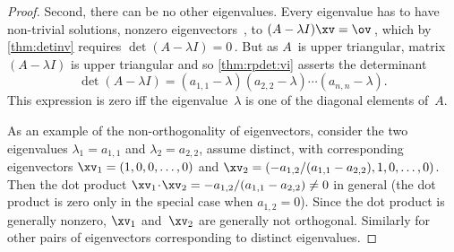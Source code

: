 \begin{proof}
Second, there can be no other eigenvalues.
Every eigenvalue has to have non-trivial solutions, nonzero eigenvectors~\xv, to \((A-\lambda I)\xv=\ov\)\,, which by \cref{thm:detinv} requires \(\det(A-\lambda I)=0\)\,.
But as \(A\)~is upper triangular, matrix \((A-\lambda I)\) is upper triangular and so \cref{thm:rpdet:vi} asserts the determinant
\begin{equation*}
\det(A-\lambda I)=(a_{1,1}-\lambda)(a_{2,2}-\lambda)
\cdots(a_{n,n}-\lambda).
\end{equation*}
This expression is zero iff the eigenvalue~\(\lambda\) is one of the diagonal elements of~\(A\).

As an example of the non-orthogonality of eigenvectors, consider the two eigenvalues \(\lambda_1=a_{1,1}\) and \(\lambda_2=a_{2,2}\), assume distinct, with  corresponding eigenvectors \(\xv_1=(1,0,0,\ldots,0)\) and \(\xv_2=(-a_{1,2}/(a_{1,1}-a_{2,2}),1,0,\ldots,0)\).
Then the dot product \(\xv_1\cdot\xv_2=-a_{1,2}/(a_{1,1}-a_{2,2})\neq 0\) in general (the dot product is zero only in the special case when \(a_{1,2}=0\)).
Since the dot product is generally nonzero, \(\xv_1\) and~\(\xv_2\) are generally not orthogonal.
Similarly for other pairs of eigenvectors corresponding to distinct eigenvalues.
\end{proof}



